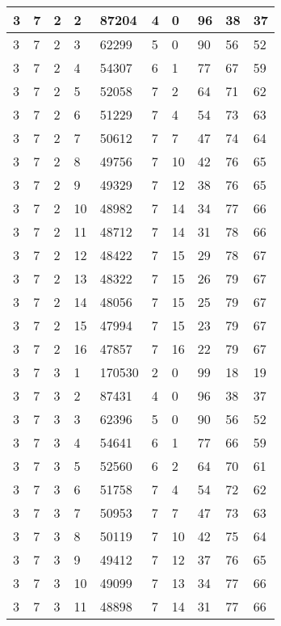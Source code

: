 \begin{table}[!ht]
\begin{tabular}{|l|l|l|l|l|l|l|l|l|l|}
        3 & 7 & 2 & 2 & 87204 & 4 & 0 & 96 & 38 & 37 \\ \hline
        3 & 7 & 2 & 3 & 62299 & 5 & 0 & 90 & 56 & 52 \\ \hline
        3 & 7 & 2 & 4 & 54307 & 6 & 1 & 77 & 67 & 59 \\ \hline
        3 & 7 & 2 & 5 & 52058 & 7 & 2 & 64 & 71 & 62 \\ \hline
        3 & 7 & 2 & 6 & 51229 & 7 & 4 & 54 & 73 & 63 \\ \hline
        3 & 7 & 2 & 7 & 50612 & 7 & 7 & 47 & 74 & 64 \\ \hline
        3 & 7 & 2 & 8 & 49756 & 7 & 10 & 42 & 76 & 65 \\ \hline
        3 & 7 & 2 & 9 & 49329 & 7 & 12 & 38 & 76 & 65 \\ \hline
        3 & 7 & 2 & 10 & 48982 & 7 & 14 & 34 & 77 & 66 \\ \hline
        3 & 7 & 2 & 11 & 48712 & 7 & 14 & 31 & 78 & 66 \\ \hline
        3 & 7 & 2 & 12 & 48422 & 7 & 15 & 29 & 78 & 67 \\ \hline
        3 & 7 & 2 & 13 & 48322 & 7 & 15 & 26 & 79 & 67 \\ \hline
        3 & 7 & 2 & 14 & 48056 & 7 & 15 & 25 & 79 & 67 \\ \hline
        3 & 7 & 2 & 15 & 47994 & 7 & 15 & 23 & 79 & 67 \\ \hline
        3 & 7 & 2 & 16 & 47857 & 7 & 16 & 22 & 79 & 67 \\ \hline
        3 & 7 & 3 & 1 & 170530 & 2 & 0 & 99 & 18 & 19 \\ \hline
        3 & 7 & 3 & 2 & 87431 & 4 & 0 & 96 & 38 & 37 \\ \hline
        3 & 7 & 3 & 3 & 62396 & 5 & 0 & 90 & 56 & 52 \\ \hline
        3 & 7 & 3 & 4 & 54641 & 6 & 1 & 77 & 66 & 59 \\ \hline
        3 & 7 & 3 & 5 & 52560 & 6 & 2 & 64 & 70 & 61 \\ \hline
        3 & 7 & 3 & 6 & 51758 & 7 & 4 & 54 & 72 & 62 \\ \hline
        3 & 7 & 3 & 7 & 50953 & 7 & 7 & 47 & 73 & 63 \\ \hline
        3 & 7 & 3 & 8 & 50119 & 7 & 10 & 42 & 75 & 64 \\ \hline
        3 & 7 & 3 & 9 & 49412 & 7 & 12 & 37 & 76 & 65 \\ \hline
        3 & 7 & 3 & 10 & 49099 & 7 & 13 & 34 & 77 & 66 \\ \hline
        3 & 7 & 3 & 11 & 48898 & 7 & 14 & 31 & 77 & 66 \\ \hline

\end{tabular}
\end{table}
